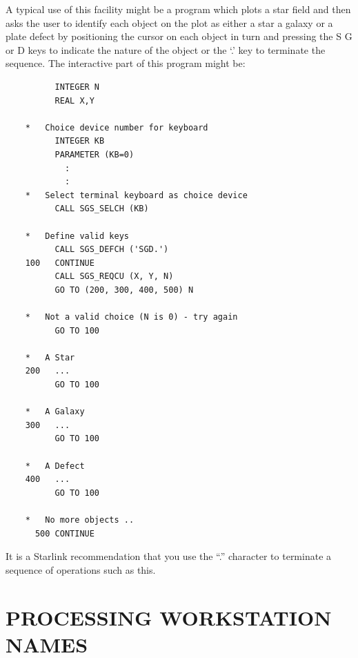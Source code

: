 \documentclass[11pt]{article}
\begin{document}
A typical use of this facility might be a program which plots a star field and 
then asks the user to identify each object on the plot as either a star a 
galaxy or a plate defect by positioning the cursor on each object in turn and 
pressing the S G or D keys to indicate the nature of the object or the `.' key 
to terminate the sequence.  The interactive part of this program might be:
\begin{verbatim}
          INTEGER N
          REAL X,Y

    *   Choice device number for keyboard
          INTEGER KB
          PARAMETER (KB=0)
            :
            :
    *   Select terminal keyboard as choice device
          CALL SGS_SELCH (KB)

    *   Define valid keys
          CALL SGS_DEFCH ('SGD.')
    100   CONTINUE
          CALL SGS_REQCU (X, Y, N)
          GO TO (200, 300, 400, 500) N

    *   Not a valid choice (N is 0) - try again
          GO TO 100

    *   A Star
    200   ...
          GO TO 100

    *   A Galaxy
    300   ...
          GO TO 100

    *   A Defect
    400   ...
          GO TO 100

    *   No more objects ..
      500 CONTINUE       
\end{verbatim}
It is a Starlink recommendation that you use the ``.'' character to terminate a 
sequence of operations such as this.

\section {PROCESSING WORKSTATION NAMES}\label{sec-processing}
\end{document}
